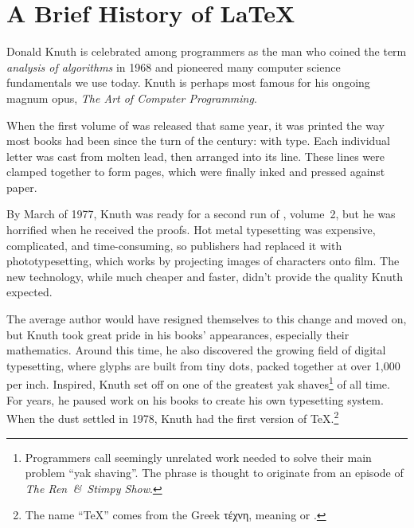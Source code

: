 \chapter{A Brief History of \texorpdfstring{\LaTeX}{LaTeX}}

\label{history}

Donald Knuth is celebrated among programmers as
the man who coined the term \emph{analysis of algorithms} in 1968
and pioneered many computer science fundamentals we use today.
Knuth is perhaps most famous for his ongoing magnum opus,
\textit{The Art of Computer Programming}.

When the first volume of  was released that same year,
it was printed the way most books had been since the turn of the century:
with  type.
Each individual letter was cast from molten lead,
then arranged into its line.
These lines were clamped together to form pages,
which were finally inked and pressed against paper.

By March of 1977, Knuth was ready for a second run of , volume~2,
but he was horrified when he received the proofs.
Hot metal typesetting was expensive, complicated, and time-consuming,
so publishers had replaced it with phototypesetting,
which works by projecting images of characters onto film.
The new technology, while much cheaper and faster,
didn't provide the quality Knuth
expected.\punckern{}

The average author would have resigned themselves to this change and moved on,
but Knuth took great pride in his books' appearances,
especially their mathematics.
Around this time, he also discovered the growing field of digital typesetting,
where glyphs are built from tiny dots,
packed together at over 1,000 per inch.
Inspired,
Knuth set off on one of the greatest yak shaves\footnote{Programmers
call seemingly unrelated work needed to solve their main problem
``yak shaving''\quotekern. The phrase is thought to originate from an episode
of \textit{The Ren~\&~Stimpy Show}.\punckern{}}
of all time.
For years, he paused work on his books to create his own
typesetting system.
When the dust settled in 1978, Knuth had the first version of
\TeX.\punckern\footnote{The name ``\TeX{}'' comes from the Greek
{τέχνη},
meaning  or .\punckern{}}

